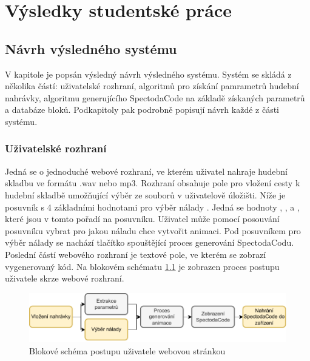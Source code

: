 \chapter{Výsledky studentské práce}



\section{Návrh výsledného systému}

V kapitole je popsán výsledný návrh výsledného systému. Systém se skládá z několika částí: uživatelské rozhraní, algoritmů pro získání pamrametrů hudební nahrávky, algoritmu generujícího SpectodaCode na základě získaných parametrů a databáze bloků. Podkapitoly pak podrobně popisují návrh každé z části systému.


\subsection{Uživatelské rozhraní} \label{sec:User_interface}

Jedná se o jednoduché webové rozhraní, ve kterém uživatel nahraje hudební skladbu ve formátu .wav nebo mp3. Rozhraní obsahuje pole pro vložení cesty k hudební skladbě umožňující výběr ze souborů v uživatelově úložišti. Níže je posuvník s 4 základními hodnotami pro výběr nálady
. Jedná se hodnoty , ,  a , které jsou v tomto pořadí na posuvníku. Uživatel může pomocí posouvání posuvníku vybrat pro jakou náladu chce vytvořit animaci. Pod posuvníkem pro výběr nálady se nachází tlačítko spouštějící proces generování SpectodaCodu.
Poslední částí webového rozhraní je textové pole, ve kterém se zobrazí vygenerovaný kód. Na blokovém schématu \ref{fig:User_interaction_diagram} je zobrazen proces postupu uživatele skrze webové rozhraní. 

 \begin{figure}[H]
    \centering
    \includegraphics[width = 1\linewidth]{obrazky/User_interaction_diagram.pdf}
    \caption{Blokové schéma postupu uživatele webovou stránkou}
    \label{fig:User_interaction_diagram}
\end{figure}

